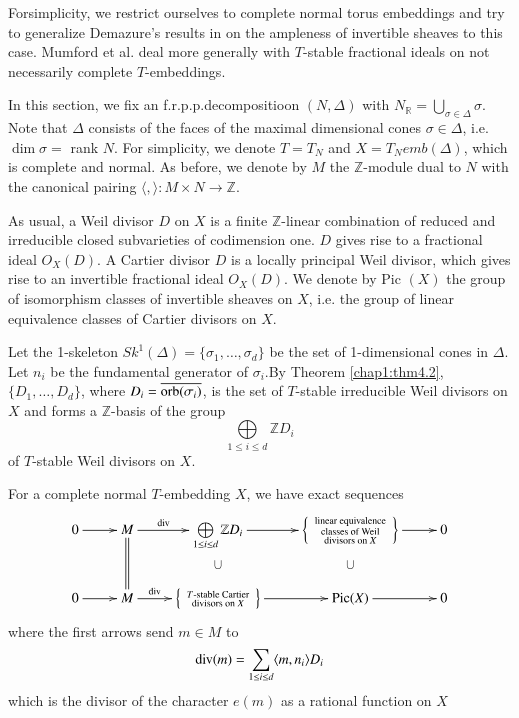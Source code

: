  For\pageoriginale simplicity, we restrict ourselves to complete
 normal torus 
 embeddings and try to generalize Demazure's results in \cite{keyD2} on the
 ampleness of invertible sheaves to this case. Mumford et al. \cite{keyTE}
 deal more generally with $T$-stable fractional ideals on not
 necessarily complete $T$-embeddings. 
 
 In this section, we fix an f.r.p.p.decompositioon $(N, \Delta)$
 with $N_{\mathbb{R}}= \bigcup \limits_{\sigma \in
   \Delta}\sigma$. Note that $\Delta$ consists of the faces of the
 maximal dimensional cones $ \sigma \in \Delta$, i.e. $\dim \sigma =
 $ rank $N$. For simplicity, we denote $T=T_N$ and $X = T_N emb
 (\Delta)$, which is complete and normal. 
  As before, we denote by $M$ the $\mathbb{Z}$-module dual to $N$ with
  the canonical pairing $\langle , \rangle : M \times  N \to \mathbb{Z}$.  
  
 As usual, a Weil divisor $D$ on $X$ is a finite $\mathbb{Z}$-linear
 combination of reduced and irreducible closed subvarieties of
 codimension one. $D$ gives rise to a fractional ideal $O_X(D)$. 
 A Cartier divisor $D$ is a locally principal Weil divisor, which gives
 rise to an invertible fractional ideal $O_X(D)$. We denote by Pic
 $(X)$ the group of isomorphism classes of invertible sheaves on $X$,
 i.e. the group of linear equivalence classes of Cartier divisors on
 $X$. 
 
 Let the 1-skeleton $Sk^1 (\Delta) = \{\sigma_1 ,\ldots, \sigma_d
 \}$ be the set of 1-dimensional cones in $\Delta$. Let $n_i$ be the
 fundamental generator of $\sigma_i$.\pageoriginale By Theorem \ref{chap1:thm4.2},
 $\{ D_1 , \ldots  , D_d \}$, where $D_i = \overline{\operatorname{orb}(\sigma_i)}$,
 is the set of  $T$-stable irreducible Weil divisors on $X$ and forms
 a  $\mathbb{Z}$-basis of the group   
 $$
 \bigoplus\limits_{1 \leq i \leq d }\mathbb{Z} D_i
 $$
 of $T$-stable Weil divisors on $X$.
 
 \begin{prop}[(Demazure)]\label{chap1:prop6.1}%
For a complete normal $T$-embedding $X$, we have exact sequences
\[
\xymatrix{
0 \ar[r] & M \ar[r]^>>>>>>>{\divv} \ar@{=}[d]& \bigoplus\limits_{1\leq i
  \leq d} \mathbb{Z}D_i 
\ar@{}[d]|{\bigcup} \ar[r] & {\left\{ \begin{smallmatrix}
& \text{linear equivalence} & \\
& \text{classes of Weil} & \\
& \text{divisors on $X$} & 
\end{smallmatrix}\right\}} \ar[r] & 0\\
0 \ar[r] & M \ar[r]^>>>>>{\divv} & 
{\left\{
\begin{smallmatrix}
& \text{$T$-stable Cartier} &\\
& \text{divisors on $X$} & 
\end{smallmatrix}
\right\}} \ar[r] & \Pic(X)  \ar@{}[u]|{\bigcup}
\ar[r] & 0
}
\]
 where the first arrows send $m \in M$ to 
 $$
 \operatorname{div} (m) = \sum\limits_{1 \leq i \leq d} \langle m,n_i \rangle D_i 
 $$
 which is the divisor of the character $e(m)$ as a rational function
 on $X$ 
  \end{prop}
  
